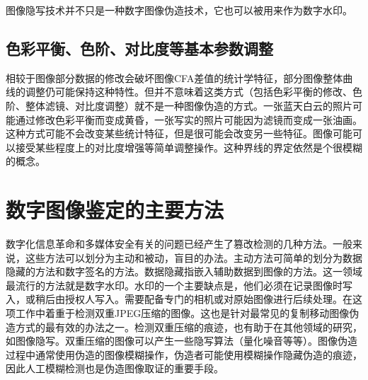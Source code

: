 \documentclass[a4paper, 10pt, notitlepage]{report}
\begin{document}
			图像隐写技术并不只是一种数字图像伪造技术，它也可以被用来作为数字水印。

		\subsection{色彩平衡、色阶、对比度等基本参数调整}
			相较于图像部分数据的修改会破坏图像CFA差值的统计学特征，部分图像整体曲线的调整仍可能保持这种特性。但并不意味着这类方式（包括色彩平衡的修改、色阶、整体滤镜、对比度调整）就不是一种图像伪造的方式。一张蓝天白云的照片可能通过修改色彩平衡而变成黄昏，一张写实的照片可能因为滤镜而变成一张油画。这种方式可能不会改变某些统计特征，但是很可能会改变另一些特征。图像可能可以接受某些程度上的对比度增强等简单调整操作。这种界线的界定依然是个很模糊的概念。
	
	\section{数字图像鉴定的主要方法}
		数字化信息革命和多媒体安全有关的问题已经产生了篡改检测的几种方法。一般来说，这些方法可以划分为主动和被动，盲目的办法。主动方法可简单的划分为数据隐藏的方法和数字签名的方法。数据隐藏指嵌入辅助数据到图像的方法。这一领域最流行的方法就是数字水印。水印的一个主要缺点是，他们必须在记录图像时写入，或稍后由授权人写入。需要配备专门的相机或对原始图像进行后续处理。在这项工作中着重于检测双重JPEG压缩的图像。这也是针对最常见的复制移动图像伪造方式的最有效的办法之一。检测双重压缩的痕迹，也有助于在其他领域的研究，如图像隐写。双重压缩的图像可以产生一些隐写算法（量化噪音等等）。图像伪造过程中通常使用伪造的图像模糊操作，伪造者可能使用模糊操作隐藏伪造的痕迹，因此人工模糊检测也是伪造图像取证的重要手段。
\end{document}
